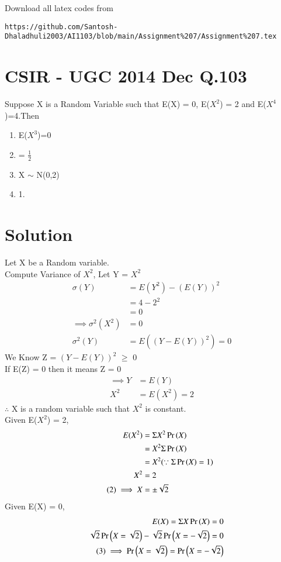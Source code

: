 \documentclass[journal,12pt,twocolumn]{IEEEtran}
\begin{document}
Download all latex codes from 
\begin{lstlisting}
https://github.com/Santosh-Dhaladhuli2003/AI1103/blob/main/Assignment%207/Assignment%207.tex
\end{lstlisting}
\section{\textbf{CSIR - UGC 2014 Dec Q.103}}
Suppose X is a Random Variable such that E(X) = 0, E($X^2$) = 2 and E($X^4$)=4.Then

\begin{enumerate}
\item  E($X^3$)=0
\item {}= $\frac{1}{2}$
\item X $\sim$ N(0,2) 
\item {} 1.
\end{enumerate}

\section{\textbf{Solution}}
Let X be a Random variable. \\
Compute Variance of $X^2$, Let Y = $X^2$
\begin{align*}
    \sigma(Y) &= E(Y^2) - (E(Y))^{2} \\
             &=  4 - 2^2 \\
             &= 0\\
\tag{1}   \implies \sigma^2(X^2) &= 0 \\
\sigma^2(Y) &= E((Y - E(Y))^2) = 0
\end{align*}
We Know Z = $(Y - E(Y))^2$ $\ge$ 0 \\
If E(Z) = 0 then it means Z = 0 
\begin{align*}
  \implies Y &= E(Y) \\
  \tag{*}
  X^2 &= E(X^2) = 2
\end{align*}
$\therefore$ X is a random variable such that $X^2$ is constant.\\
Given E($X^2$) = 2,
\begin{align*}
    E(X^2) &= \Sigma X^2\Pr\left(X\right) \\
           &= X^2\Sigma \Pr\left(X\right)  \\
           &= X^2 (\because \Sigma \Pr\left(X\right) = 1) \\
       X^2 &= 2 \\
\tag{2} \label{X}
\implies X &= \pm \sqrt{2}
\end{align*}
Given E(X) = 0,
\begin{align*}
                      E(X) = \Sigma X\Pr\left(X\right) = 0 \\
                    \sqrt{2}\Pr\left(X = \sqrt{2}\right)-\sqrt{2}\Pr\left(X = -\sqrt{2}\right) = 0\\
      \tag{3} \label{P(X)}
\implies \Pr\left(X = \sqrt{2}\right) = \Pr\left(X = -\sqrt{2}\right)
\end{align*}
\end{document}
